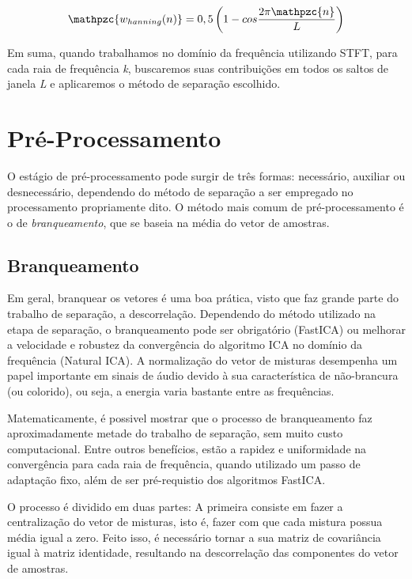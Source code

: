         \begin{equation}\label{eq:hanning}
            \mathpzc{w_{hanning}(n)} = 0,5 \left( 1 - cos\frac{2\pi\mathpzc{n}}{L}\right)
        \end{equation}
        
        Em suma, quando trabalhamos no domínio da frequência utilizando STFT, para cada raia de frequência \textit{k}, buscaremos suas contribuições em todos os saltos de janela \textit{L} e aplicaremos o método de separação escolhido.
        
\section{Pré-Processamento}
        O estágio de pré-processamento pode surgir de três formas: necessário, auxiliar ou desnecessário, dependendo do método de separação a ser empregado no processamento propriamente dito. O método mais comum de pré-processamento é o de \textit{branqueamento}, que se baseia na média do vetor de amostras.
    
    \subsection{Branqueamento} \label{sec:whitening}
        Em geral, branquear os vetores é uma boa prática, visto que faz grande parte do trabalho de separação, a descorrelação. Dependendo do método utilizado na etapa de separação, o branqueamento pode ser obrigatório (FastICA) ou melhorar a velocidade e robustez da convergência do algoritmo ICA no domínio da frequência (Natural ICA). A normalização do vetor de misturas desempenha um papel importante em sinais de áudio devido à sua característica de não-brancura (ou colorido), ou seja, a energia varia bastante entre as frequências.
        
        Matematicamente, é possivel mostrar que o processo de branqueamento faz aproximadamente metade do trabalho de separação, sem muito custo computacional. Entre outros benefícios, estão a rapidez e uniformidade na convergência para cada raia de frequência, quando utilizado um passo de adaptação fixo, além de ser pré-requistio dos algoritmos FastICA.
        
        O processo é dividido em duas partes: A primeira consiste em fazer a centralização do vetor de misturas, isto é, fazer com que cada mistura possua média igual a zero. Feito isso, é necessário tornar a sua matriz de covariância igual à matriz identidade, resultando na descorrelação das componentes do vetor de amostras.
        

